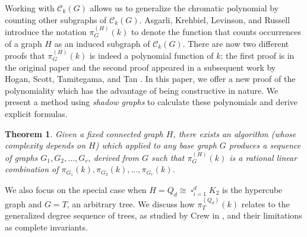 \documentclass[12pt,reqno,dvipsnames]{amsart}
\newtheorem{theorem}{Theorem}[section]
\theoremstyle{definition}
\begin{document}
Working with $\mathcal{C}_k(G)$ allows us to generalize the chromatic polynomial by counting other subgraphs of $\mathcal{C}_k(G)$. Asgarli, Krehbiel, Levinson, and Russell \cite{AKLR25} introduce the notation $\pi_G^{(H)}(k)$ to denote the function that counts occurrences of a graph $H$ as an induced subgraph of $\mathcal{C}_k(G)$. There are now two different proofs that $\pi_G^{(H)}(k)$ is indeed a polynomial function of $k$: the first proof is in the original paper \cite{AKLR25} and the second proof appeared in a subsequent work by Hogan, Scott, Tamitegama, and Tan \cite{HSTT24}. In this paper, we offer a new proof of the polynomiality which has the advantage of being constructive in nature. We present a method using \emph{shadow graphs} to calculate these polynomials and derive explicit formulas. 

\begin{theorem}
Given a fixed connected graph $H$, there exists an algorithm (whose complexity depends on $H$) which applied to any base graph $G$ produces a sequence of graphs $G_1, G_2, \ldots, G_r$, derived from $G$ such that $\pi_G^{(H)}(k)$ is a rational linear combination of $\pi_{G_1}(k), \pi_{G_2}(k), \ldots, \pi_{G_r}(k)$.     
\end{theorem}

We also focus on the special case when $H=Q_d\cong \mathop{\square}_{i=1}^d K_2$ is the hypercube graph and $G=T$, an arbitrary tree. We discuss how $\pi_{T}^{(Q_d)}(k)$ relates to the generalized degree sequence of trees, as studied by Crew in \cite{Cre20}, and their limitations as complete invariants.
\end{document}
